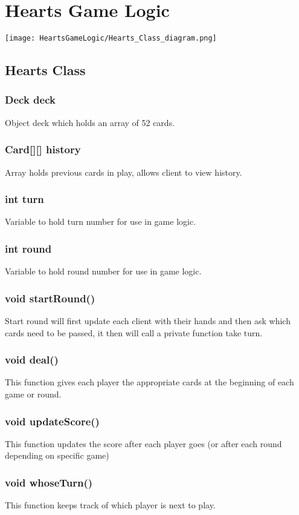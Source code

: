 \section{Hearts Game Logic}

\texttt{[image: HeartsGameLogic/Hearts\_Class\_diagram.png]}

\subsection{Hearts Class}

\subsubsection{Deck deck}
	Object deck which holds an array of 52 cards.
\subsubsection{Card[][] history}
	Array holds previous cards in play, allows client to view history.
\subsubsection{int turn}
	Variable to hold turn number for use in game logic.
\subsubsection{int round}
	Variable to hold round number for use in game logic.
\subsubsection{void startRound()}
	Start round will first update each client with their hands and then ask which cards need to be passed, it then will call a private function take turn.  
\subsubsection{void deal()}
	This function gives each player the appropriate cards at the beginning of each game or round.
\subsubsection{void updateScore()}
	This function updates the score after each player goes (or after each round depending on specific game)
\subsubsection{void whoseTurn()}
	This function keeps track of which player is next to play.
